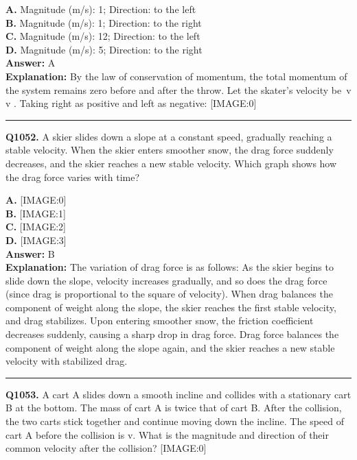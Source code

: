 \documentclass[12pt]{article}
\begin{document}
\textbf{A.} Magnitude (m/s): 1; Direction: to the left \\
\textbf{B.} Magnitude (m/s): 1; Direction: to the right \\
\textbf{C.} Magnitude (m/s): 12; Direction: to the left \\
\textbf{D.} Magnitude (m/s): 5; Direction: to the right \\

\textbf{Answer:} A \\
\textbf{Explanation:} By the law of conservation of momentum, the total momentum of the system remains zero before and after the throw. Let the skater’s velocity be v
v
. Taking right as positive and left as negative:
[IMAGE:0]

\hrule
\vspace{1em}


\noindent
\textbf{Q1052.} A skier slides down a slope at a constant speed, gradually reaching a stable velocity. When the skier enters smoother snow, the drag force suddenly decreases, and the skier reaches a new stable velocity. Which graph shows how the drag force varies with time?



\textbf{A.} [IMAGE:0] \\
\textbf{B.} [IMAGE:1] \\
\textbf{C.} [IMAGE:2] \\
\textbf{D.} [IMAGE:3] \\

\textbf{Answer:} B \\
\textbf{Explanation:} The variation of drag force is as follows:
As the skier begins to slide down the slope, velocity increases gradually, and so does the drag force (since drag is proportional to the square of velocity).
When drag balances the component of weight along the slope, the skier reaches the first stable velocity, and drag stabilizes.
Upon entering smoother snow, the friction coefficient decreases suddenly, causing a sharp drop in drag force.
Drag force balances the component of weight along the slope again, and the skier reaches a new stable velocity with stabilized drag.

\hrule
\vspace{1em}


\noindent
\textbf{Q1053.} A cart A slides down a smooth incline and collides with a stationary cart B at the bottom. The mass of cart A is twice that of cart B. After the collision, the two carts stick together and continue moving down the incline. The speed of cart A before the collision is v. What is the magnitude and direction of their common velocity after the collision?
[IMAGE:0]
\end{document}
